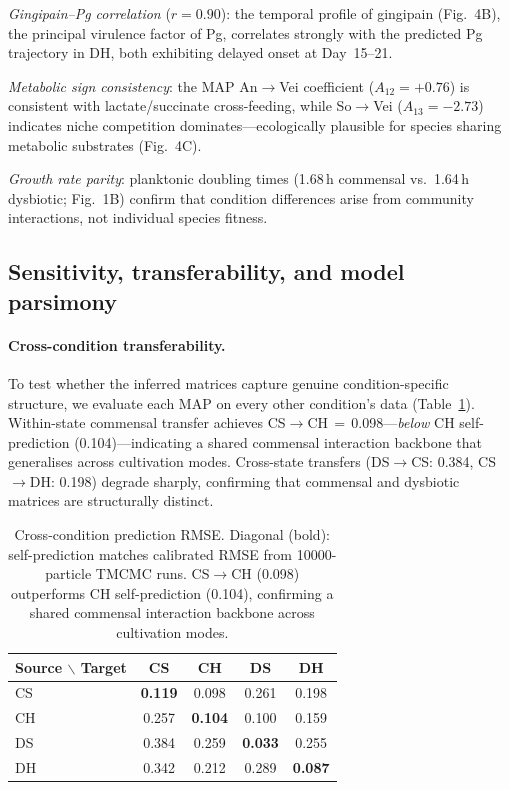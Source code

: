 \documentclass[11pt,a4paper]{article}
\begin{document}
\textit{Gingipain--Pg correlation} ($r=0.90$):
the temporal profile of gingipain (Fig.~4B), the principal virulence factor of Pg, correlates strongly with the predicted Pg trajectory in DH, both exhibiting delayed onset at Day~15--21.

\textit{Metabolic sign consistency}:
the MAP An$\to$Vei coefficient ($A_{12}=+0.76$) is consistent with lactate/succinate cross-feeding, while So$\to$Vei ($A_{13}=-2.73$) indicates niche competition dominates---ecologically plausible for species sharing metabolic substrates (Fig.~4C).

\textit{Growth rate parity}:
planktonic doubling times (1.68\,h commensal vs.\ 1.64\,h dysbiotic; Fig.~1B) confirm that condition differences arise from community interactions, not individual species fitness.

\subsection{Sensitivity, transferability, and model parsimony}
\label{sec:sensitivity}

\paragraph{Cross-condition transferability.}
To test whether the inferred matrices capture genuine condition-specific structure, we evaluate each MAP on every other condition's data (Table~\ref{tab:cross_prediction}).
Within-state commensal transfer achieves CS$\to$CH\,$=$\,0.098---\emph{below} CH self-prediction (0.104)---indicating a shared commensal interaction backbone that generalises across cultivation modes.
Cross-state transfers (DS$\to$CS: 0.384, CS$\to$DH: 0.198) degrade sharply, confirming that commensal and dysbiotic matrices are structurally distinct.

\begin{table}[htbp]
\centering\small
\begin{tabular}{@{}lcccc@{}}
\toprule
Source $\backslash$ Target & CS & CH & DS & DH \\
\midrule
CS & \textbf{0.119} & 0.098 & 0.261 & 0.198 \\
CH & 0.257 & \textbf{0.104} & 0.100 & 0.159 \\
DS & 0.384 & 0.259 & \textbf{0.033} & 0.255 \\
DH & 0.342 & 0.212 & 0.289 & \textbf{0.087} \\
\bottomrule
\end{tabular}
\caption{Cross-condition prediction RMSE. Diagonal (bold): self-prediction matches calibrated RMSE from 10000-particle TMCMC runs. CS$\to$CH (0.098) outperforms CH self-prediction (0.104), confirming a shared commensal interaction backbone across cultivation modes.}
\label{tab:cross_prediction}
\end{table}
\end{document}
